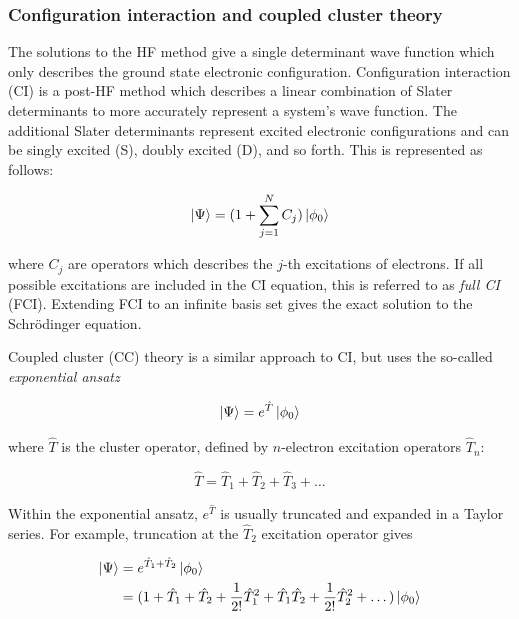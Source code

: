 \subsubsection{Configuration interaction and coupled cluster theory}

The solutions to the HF method give a single determinant wave function which only describes the ground state electronic configuration. Configuration interaction (CI) is a post-HF method which describes a linear combination of Slater determinants to more accurately represent a system's wave function. The additional Slater determinants represent excited electronic configurations and can be singly excited (S), doubly excited (D), and so forth. This is represented as follows:

\begin{equation}
  \ket{\Psi} = (1+\sum_{j=1}^N C_j) \ket{\phi_0}
\end{equation}

\noindent where $C_j$ are operators which describes the $j$-th excitations of electrons. If all possible excitations are included in the CI equation, this is referred to as \emph{full CI} (FCI). Extending FCI to an infinite basis set gives the exact solution to the Schr{\"o}dinger equation.

Coupled cluster (CC) theory\cite{Crawford2000} is a similar approach to CI, but uses the so-called \emph{exponential ansatz}

\begin{equation}
  \ket{\Psi} = e^{\hat{T}}\ket{\phi_0}
\end{equation}

\noindent where $\hat{T}$ is the cluster operator, defined by $n$-electron excitation operators $\hat{T}_n$:

\begin{equation}
  \hat{T} = \hat{T}_1 + \hat{T}_2 + \hat{T}_3 + \dots
\end{equation}

Within the exponential ansatz, $e^{\hat{T}}$ is usually truncated and expanded in a Taylor series. For example, truncation at the $\hat{T}_2$ excitation operator gives

\begin{equation}
\begin{split}
  \ket{\Psi} &= e^{\hat{T}_1+\hat{T}_2}\ket{\phi_0} \\
  &= (1 + \hat{T}_1 + \hat{T}_2 +  \frac{1}{2!}\hat{T}_1^2 + \hat{T}_1\hat{T}_2 + \frac{1}{2!}\hat{T}_2^2 + \dots)
  \ket{\phi_0}
\end{split}
\end{equation}

